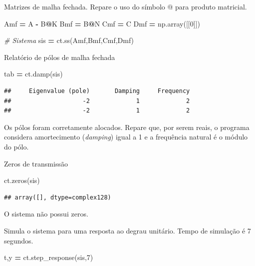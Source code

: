 \documentclass[
]{book}
\newenvironment{Shaded}{\begin{snugshade}}{\end{snugshade}}
\newcommand{\CommentTok}[1]{\textcolor[rgb]{0.56,0.35,0.01}{\textit{#1}}}
\newcommand{\DecValTok}[1]{\textcolor[rgb]{0.00,0.00,0.81}{#1}}
\newcommand{\NormalTok}[1]{#1}
\newcommand{\OperatorTok}[1]{\textcolor[rgb]{0.81,0.36,0.00}{\textbf{#1}}}
\begin{document}
Matrizes de malha fechada. Repare o uso do símbolo @ para produto matricial.

\begin{Shaded}
\begin{Highlighting}[]
\NormalTok{Amf }\OperatorTok{=}\NormalTok{ A }\OperatorTok{{-}}\NormalTok{ B}\OperatorTok{@}\NormalTok{K}
\NormalTok{Bmf }\OperatorTok{=}\NormalTok{ B}\OperatorTok{@}\NormalTok{N}
\NormalTok{Cmf }\OperatorTok{=}\NormalTok{ C}
\NormalTok{Dmf }\OperatorTok{=}\NormalTok{ np.array([[}\DecValTok{0}\NormalTok{]])}

\CommentTok{\# Sistema}
\NormalTok{sis }\OperatorTok{=}\NormalTok{ ct.ss(Amf,Bmf,Cmf,Dmf)}
\end{Highlighting}
\end{Shaded}

Relatório de pólos de malha fechada

\begin{Shaded}
\begin{Highlighting}[]
\NormalTok{tab }\OperatorTok{=}\NormalTok{ ct.damp(sis)}
\end{Highlighting}
\end{Shaded}

\begin{verbatim}
##     Eigenvalue (pole)       Damping     Frequency
##                    -2             1             2
##                    -2             1             2
\end{verbatim}

Os pólos foram corretamente alocados. Repare que, por serem reais, o programa considera amortecimento (\emph{damping}) igual a 1 e a frequência natural é o módulo do pólo.

Zeros de transmissão

\begin{Shaded}
\begin{Highlighting}[]
\NormalTok{ct.zeros(sis)}
\end{Highlighting}
\end{Shaded}

\begin{verbatim}
## array([], dtype=complex128)
\end{verbatim}

O sistema não possui zeros.

Simula o sistema para uma resposta ao degrau unitário. Tempo de simulação é 7 segundos.

\begin{Shaded}
\begin{Highlighting}[]
\NormalTok{t,y }\OperatorTok{=}\NormalTok{ ct.step\_response(sis,}\DecValTok{7}\NormalTok{)}
\end{Highlighting}
\end{Shaded}
\end{document}
